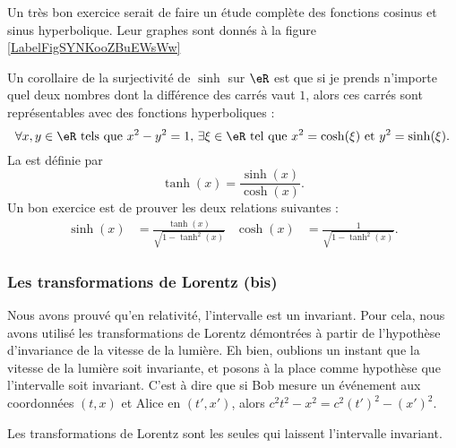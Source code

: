 \newcommand{\CaptionFigSYNKooZBuEWsWw}{En rouge, la fonction $x\mapsto \sinh(x)$ et en bleu, la fonction $x\mapsto\cosh(x)$.}


Un très bon exercice serait de faire un étude complète des fonctions cosinus et sinus hyperbolique. Leur graphes sont donnés à la figure \ref{LabelFigSYNKooZBuEWsWw}

Un corollaire de la surjectivité de $\sinh$ sur $\eR$ est que si je prends n'importe quel deux nombres dont la différence des carrés vaut $1$, alors ces carrés sont représentables avec des fonctions hyperboliques :
\[ 
  \forall x,y\in\eR \text{ tels que } x^2-y^2=1,\,\exists\xi\in\eR \text{ tel que } x^2=\cosh(\xi)\text{ et }y^2=\sinh(\xi).
\]
La  est définie par
\begin{equation}
\tanh(x)=\frac{ \sinh(x) }{ \cosh(x) }.
\end{equation}
Un bon exercice est de prouver les deux relations suivantes :
\begin{align}		\label{EqRelSinhthcosh}
	\sinh(x)&=\frac{ \tanh(x) }{ \sqrt{1-\tanh^2(x)} }	&\cosh(x)&=\frac{1}{ \sqrt{1-\tanh^2(x)} }.
\end{align}

\subsubsection{Les transformations de Lorentz (bis)}

Nous avons prouvé qu'en relativité, l'intervalle est un invariant. Pour cela, nous avons utilisé les transformations de Lorentz démontrées à partir de l'hypothèse d'invariance de la vitesse de la lumière. Eh bien, oublions un instant que la vitesse de la lumière soit invariante, et posons à la place comme hypothèse que l'intervalle soit invariant. C'est à dire que si Bob mesure un événement aux coordonnées $(t,x)$ et Alice en $(t',x')$, alors $c^2t^2-x^2=c^2(t')^2-(x')^2$.

\begin{theorem}
Les transformations de Lorentz sont les seules qui laissent l'intervalle invariant.
\end{theorem}

